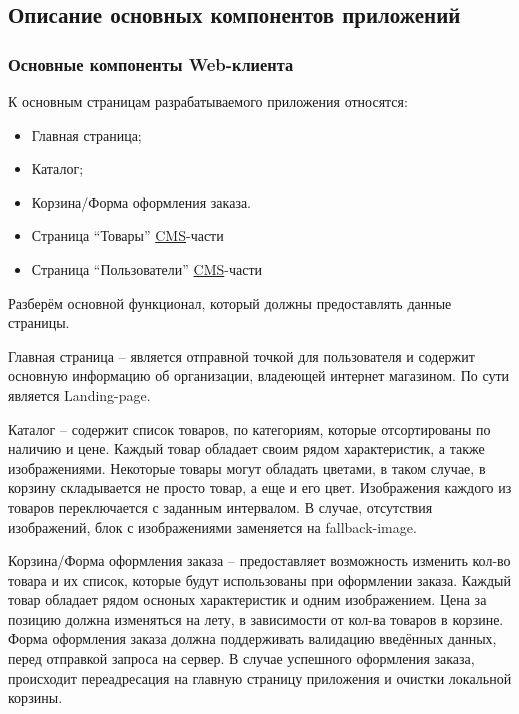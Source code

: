 \subsection{Описание основных компонентов приложений}\label{subsec:2-common-components}\indent


\subsubsection{Основные компоненты Web-клиента}

К основным страницам разрабатываемого приложения относятся:

\begin{itemize}
    \item Главная страница;
    \item Каталог;
    \item Корзина/Форма оформления заказа.
    \item Страница “Товары” \hyperlink{gloss:cms}{CMS}-части
    \item Страница “Пользователи” \hyperlink{gloss:cms}{CMS}-части
\end{itemize}

Разберём основной функционал, который должны предоставлять данные страницы.

Главная страница – является отправной точкой для пользователя и содержит основную информацию об организации, владеющей интернет магазином.
По сути является Landing-page.

Каталог – содержит список товаров, по категориям, которые отсортированы по наличию и цене.
Каждый товар обладает своим рядом характеристик, а также изображениями.
Некоторые товары могут обладать цветами, в таком случае, в корзину складывается не просто товар, а еще и его цвет.
Изображения каждого из товаров переключается с заданным интервалом.
В случае, отсутствия изображений, блок с изображениями заменяется на fallback-image.

Корзина/Форма оформления заказа – предоставляет возможность изменить кол-во товара и их список, которые будут использованы при оформлении заказа.
Каждый товар обладает рядом осноных характеристик и одним изображением.
Цена за позицию должна изменяться на лету, в зависимости от кол-ва товаров в корзине.
Форма оформления заказа должна поддерживать валидацию введённых данных, перед отправкой запроса на сервер.
В случае успешного оформления заказа, происходит переадресация на главную страницу приложения и очистки локальной корзины.

